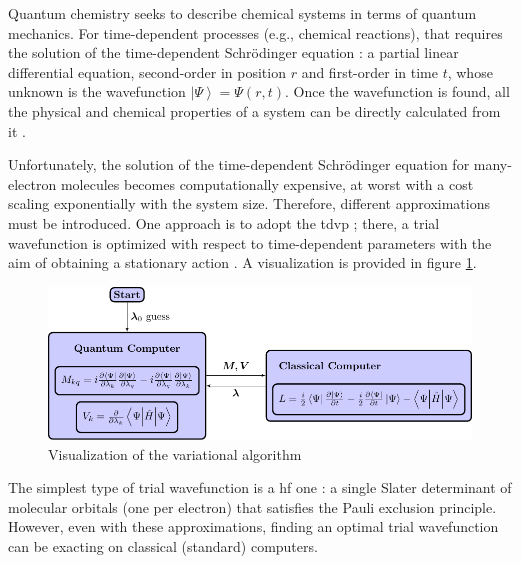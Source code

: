 \documentclass{aux/ttuthes2007}
\newcommand{\ket}[1]{\ensuremath{\left|#1\right\rangle}}
\begin{document}
Quantum chemistry  seeks to describe chemical systems in terms of quantum mechanics.
For time-dependent processes (e.g., chemical reactions), that requires the solution of the time-dependent Schrödinger equation : a partial linear differential equation, second-order in position $r$ and first-order in time $t$, whose unknown is the wavefunction $\ket \Psi = \Psi(r, t)$.
Once the wavefunction is found, all the physical and chemical properties of a system can be directly calculated from it .

Unfortunately, the solution of the time-dependent Schrödinger equation for many-electron molecules becomes computationally expensive, at worst with a cost scaling exponentially with the system size.
Therefore, different approximations must be introduced.
One approach is to adopt the \gls{tdvp} ;
there, a trial wavefunction is optimized with respect to time-dependent parameters with the aim of obtaining a stationary action . A visualization is provided in figure \ref{fig:TDVP}.

\begin{figure}[ht!]
	\centering
  \includegraphics[width=\linewidth]{img/variation_figure.pdf}
  \caption{Visualization of the variational algorithm}
  \label{fig:TDVP}
\end{figure}

The simplest type of trial wavefunction is a \gls{hf} one :
a single Slater determinant of molecular orbitals (one per electron) that satisfies the Pauli exclusion principle.
However, even with these approximations, finding an optimal trial wavefunction can be exacting on classical (standard) computers.
\end{document}
